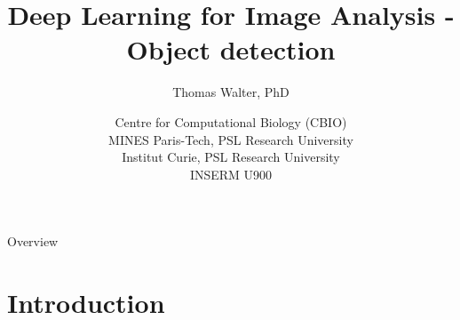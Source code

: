 \documentclass[xcolor=pdftex,dvipsnames,table]{beamer}
\title{Deep Learning for Image Analysis - \\
	   Object detection}
\author{Thomas Walter, PhD}
\date{Centre for Computational Biology (CBIO) \\
	  MINES Paris-Tech, PSL Research University \\
	  Institut Curie, PSL Research University \\
	  INSERM U900}
\begin{document}
\begin{frame}
\titlepage
\end{frame}

\begin{frame}{Overview}
\tableofcontents
\end{frame}

\section{Introduction}

\end{document}

